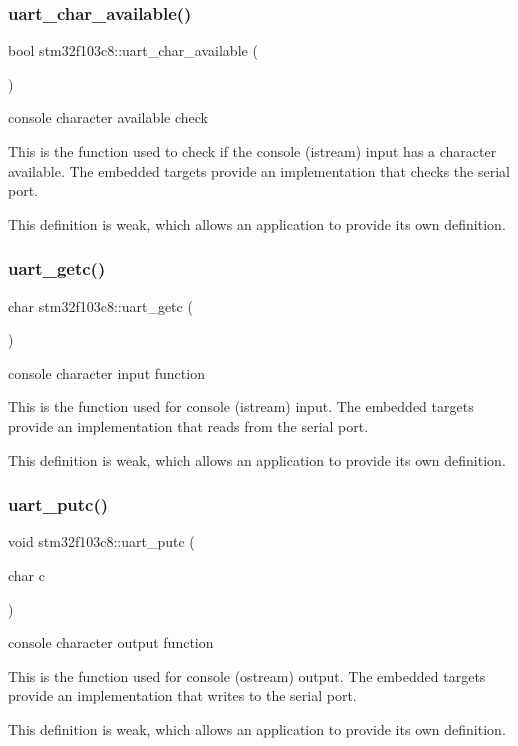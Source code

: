 \subsubsection{\texorpdfstring{uart\+\_\+char\+\_\+available()}{uart\_char\_available()}}
{\footnotesize\ttfamily bool stm32f103c8\+::uart\+\_\+char\+\_\+available (\begin{DoxyParamCaption}{ }\end{DoxyParamCaption})}

console character available check

This is the function used to check if the console (istream) input has a character available. The embedded targets provide an implementation that checks the serial port.

This definition is weak, which allows an application to provide its own definition. \mbox{\label{namespacestm32f103c8_ad5b6e620a169eb8f233dc3f158e15ac7}} 
\subsubsection{\texorpdfstring{uart\+\_\+getc()}{uart\_getc()}}
{\footnotesize\ttfamily char stm32f103c8\+::uart\+\_\+getc (\begin{DoxyParamCaption}{ }\end{DoxyParamCaption})}

console character input function

This is the function used for console (istream) input. The embedded targets provide an implementation that reads from the serial port.

This definition is weak, which allows an application to provide its own definition. \mbox{\label{namespacestm32f103c8_a3b4365830ed2e5f66b80cac899ed29d4}} 
\subsubsection{\texorpdfstring{uart\+\_\+putc()}{uart\_putc()}}
{\footnotesize\ttfamily void stm32f103c8\+::uart\+\_\+putc (\begin{DoxyParamCaption}\item[{char}]{c }\end{DoxyParamCaption})}

console character output function

This is the function used for console (ostream) output. The embedded targets provide an implementation that writes to the serial port.

This definition is weak, which allows an application to provide its own definition. 